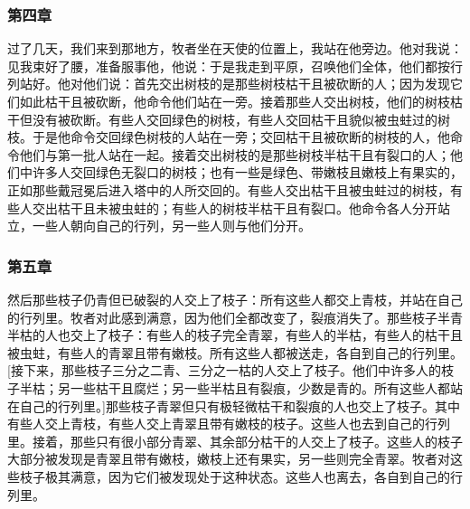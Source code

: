 
\subsubsection{第四章}

过了几天，我们来到那地方，牧者坐在天使的位置上，我站在他旁边。他对我说：见我束好了腰，准备服事他，他说：于是我走到平原，召唤他们全体，他们都按行列站好。他对他们说：首先交出树枝的是那些树枝枯干且被砍断的人；因为发现它们如此枯干且被砍断，他命令他们站在一旁。接着那些人交出树枝，他们的树枝枯干但没有被砍断。有些人交回绿色的树枝，有些人交回枯干且貌似被虫蛀过的树枝。于是他命令交回绿色树枝的人站在一旁；交回枯干且被砍断的树枝的人，他命令他们与第一批人站在一起。接着交出树枝的是那些树枝半枯干且有裂口的人；他们中许多人交回绿色无裂口的树枝；也有一些是绿色、带嫩枝且嫩枝上有果实的，正如那些戴冠冕后进入塔中的人所交回的。有些人交出枯干且被虫蛀过的树枝，有些人交出枯干且未被虫蛀的；有些人的树枝半枯干且有裂口。他命令各人分开站立，一些人朝向自己的行列，另一些人则与他们分开。\par


\subsubsection{第五章}

然后那些枝子仍青但已破裂的人交上了枝子：所有这些人都交上青枝，并站在自己的行列里。牧者对此感到满意，因为他们全都改变了，裂痕消失了。那些枝子半青半枯的人也交上了枝子：有些人的枝子完全青翠，有些人的半枯，有些人的枯干且被虫蛀，有些人的青翠且带有嫩枝。所有这些人都被送走，各自到自己的行列里。[接下来，那些枝子三分之二青、三分之一枯的人交上了枝子。他们中许多人的枝子半枯；另一些枯干且腐烂；另一些半枯且有裂痕，少数是青的。所有这些人都站在自己的行列里。]那些枝子青翠但只有极轻微枯干和裂痕的人也交上了枝子。其中有些人交上青枝，有些人交上青翠且带有嫩枝的枝子。这些人也去到自己的行列里。接着，那些只有很小部分青翠、其余部分枯干的人交上了枝子。这些人的枝子大部分被发现是青翠且带有嫩枝，嫩枝上还有果实，另一些则完全青翠。牧者对这些枝子极其满意，因为它们被发现处于这种状态。这些人也离去，各自到自己的行列里。\par


